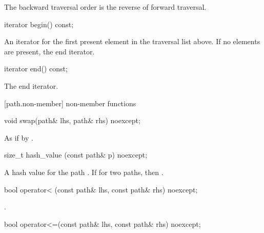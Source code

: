 \pnum
The backward traversal order is the reverse of forward traversal.

%
\begin{itemdecl}
iterator begin() const;
\end{itemdecl}

\begin{itemdescr}
\pnum
\returns An iterator for the first present element in the traversal
list above. If no elements are present, the end iterator.
\end{itemdescr}

%
\begin{itemdecl}
iterator end() const;
\end{itemdecl}

\begin{itemdescr}
\pnum
\returns The end iterator.
\end{itemdescr}

[path.non-member]{ non-member functions}

%
\begin{itemdecl}
void swap(path& lhs, path& rhs) noexcept;
\end{itemdecl}

\begin{itemdescr}
\pnum
\effects As if by .
\end{itemdescr}

%
\begin{itemdecl}
size_t hash_value (const path& p) noexcept;
\end{itemdecl}

\begin{itemdescr}
\pnum
\returns A hash value for the path . If
  for two paths,  then .
\end{itemdescr}

%
\begin{itemdecl}
bool operator< (const path& lhs, const path& rhs) noexcept;
\end{itemdecl}

\begin{itemdescr}
\pnum
\returns {}.
\end{itemdescr}

%
\begin{itemdecl}
bool operator<=(const path& lhs, const path& rhs) noexcept;
\end{itemdecl}

